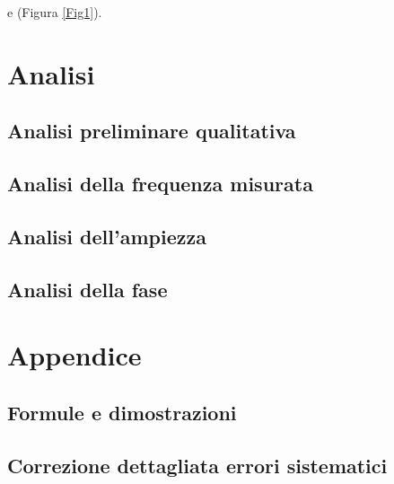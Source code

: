 \documentclass[12pt,a4paper]{article}
\begin{document}
e (Figura \ref{Fig1}).



\section{Analisi}

\subsection{Analisi preliminare qualitativa}

\subsection{Analisi della frequenza misurata}

\subsection{Analisi dell'ampiezza}

\subsection{Analisi della fase}

\section{Appendice}

\subsection{Formule e dimostrazioni}

\subsection{Correzione dettagliata errori sistematici}
\end{document}
